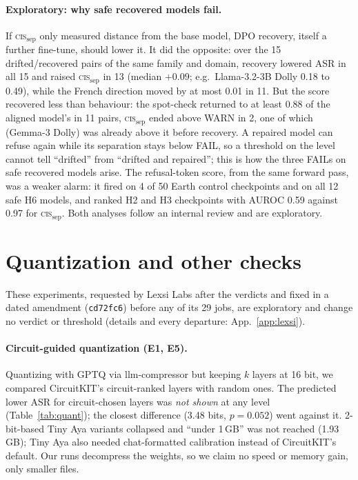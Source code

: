 \documentclass[11pt]{article}
\newcommand{\cissep}{\textsc{cis}$_{\text{sep}}$}
\begin{document}
\paragraph{Exploratory: why safe recovered models fail.} If \cissep{} only measured distance from the base model, DPO
recovery, itself a further fine-tune, should lower it. It did the opposite: over the 15 drifted/recovered pairs of the
same family and domain, recovery lowered ASR in all 15 and raised \cissep{} in 13 (median $+0.09$; e.g.\ Llama-3.2-3B
Dolly 0.18 to 0.49), while the French direction moved by at most 0.01 in 11. But the score recovered less than
behaviour: the spot-check returned to at least 0.88 of the aligned model's in 11 pairs, \cissep{} ended above WARN in 2,
one of which (Gemma-3 Dolly) was already above it before recovery.
A repaired model can refuse again while its separation stays below FAIL, so a threshold on the level cannot tell
``drifted'' from ``drifted and repaired''; this is how the three FAILs on safe recovered models arise. The refusal-token
score, from the same forward pass, was a weaker alarm: it fired on 4 of 50 Earth control checkpoints and on all 12 safe
H6 models, and ranked H2 and H3 checkpoints with AUROC 0.59 against 0.97 for \cissep{}. Both analyses follow an
internal review and are exploratory.

\section{Quantization and other checks}
\label{sec:lexsi}

These experiments, requested by Lexsi Labs after the verdicts and fixed in a dated amendment (\texttt{cd72fc6})
before any of its 29 jobs, are exploratory and change no verdict or threshold (details and every departure:
App.~\ref{app:lexsi}).

\paragraph{Circuit-guided quantization (E1, E5).} Quantizing with GPTQ \citep{frantar2022gptq} via llm-compressor
\citep{vllm2026llmcompressor} but keeping $k$ layers at 16 bit, we compared CircuitKIT's circuit-ranked layers with
random ones. The predicted lower ASR for circuit-chosen layers was \emph{not shown} at any level
(Table~\ref{tab:quant}); the closest difference (3.48 bits, $p=0.052$) went against it. 2-bit-based Tiny Aya
variants collapsed and ``under 1\,GB'' was not reached (1.93\,GB); Tiny Aya also needed chat-formatted calibration
instead of CircuitKIT's default. Our runs decompress the weights, so we claim no speed or memory gain, only
smaller files.
\end{document}
